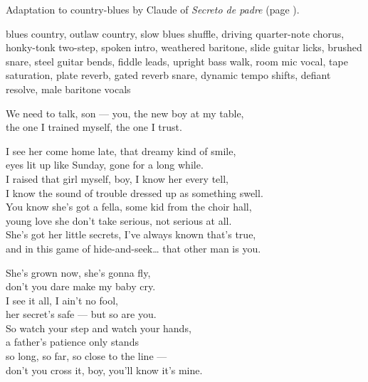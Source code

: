
\begin{notes}
Adaptation to country-blues by Claude of \emph{Secreto de padre} (page \pageref{sec:secreto-de-padre}).
\end{notes}
\begin{style}
blues country, outlaw country, slow blues shuffle, driving quarter-note chorus, honky-tonk two-step, spoken intro, weathered baritone, slide guitar licks, brushed snare, steel guitar bends, fiddle leads, upright bass walk, room mic vocal, tape saturation, plate reverb, gated reverb snare, dynamic tempo shifts, defiant resolve, male baritone vocals
\end{style}
\begin{lyrics}
We need to talk, son — you, the new boy at my table,\\
the one I trained myself, the one I trust.

I see her come home late, that dreamy kind of smile,\\
eyes lit up like Sunday, gone for a long while.\\
I raised that girl myself, boy, I know her every tell,\\
I know the sound of trouble dressed up as something swell.\\
You know she's got a fella, some kid from the choir hall,\\
young love she don't take serious, not serious at all.\\
She's got her little secrets, I've always known that's true,\\
and in this game of hide-and-seek… that other man is you.

She's grown now, she's gonna fly,\\
don't you dare make my baby cry.\\
I see it all, I ain't no fool,\\
her secret's safe — but so are you.\\
So watch your step and watch your hands,\\
a father's patience only stands\\
so long, so far, so close to the line —\\
don't you cross it, boy, you'll know it's mine.


\end{lyrics}
